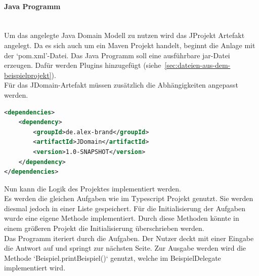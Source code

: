 \documentclass[./einleitung.tex]{subfiles}
\begin{document}
    \paragraph{Java Programm}\mbox{}\\
    Um das angelegte Java Domain Modell zu nutzen wird das JProjekt Artefakt angelegt.
    Da es sich auch um ein Maven Projekt handelt, beginnt die Anlage mit der `pom.xml'-Datei.
    Das Java Programm soll eine ausführbare \acrshort{jar}-Datei erzeugen.
    Dafür werden Plugins hinzugefügt (siehe~\ref{sec:dateien-aus-dem-beispielprojekt}).\\
    Für das JDomain-Artefakt müssen zusätzlich die Abhängigkeiten angepasst werden.
    \begin{lstlisting}[language=XML, caption=Abhängigkeit zum JDomain Artefakt, label=lst:dependeciesJProjekt]
<dependencies>
    <dependency>
        <groupId>de.alex-brand</groupId>
        <artifactId>JDomain</artifactId>
        <version>1.0-SNAPSHOT</version>
    </dependency>
</dependencies>
    \end{lstlisting}
    Nun kann die Logik des Projektes implementiert werden.\\
    Es werden die gleichen Aufgaben wie im Typescript Projekt genutzt.
    Sie werden diesmal jedoch in einer Liste gespeichert.
    Für die Initialisierung der Aufgaben wurde eine eigene Methode implementiert.
    Durch diese Methoden könnte in einem größeren Projekt die Initialisierung überschrieben werden.\\
    Das Programm iteriert durch die Aufgaben.
    Der Nutzer deckt mit einer Eingabe die Antwort auf und springt zur nächsten Seite.
    Zur Ausgabe werden wird die Methode `Beispiel.printBeispiel()` genutzt, welche im BeispielDelegate implementiert wird.
\end{document}

